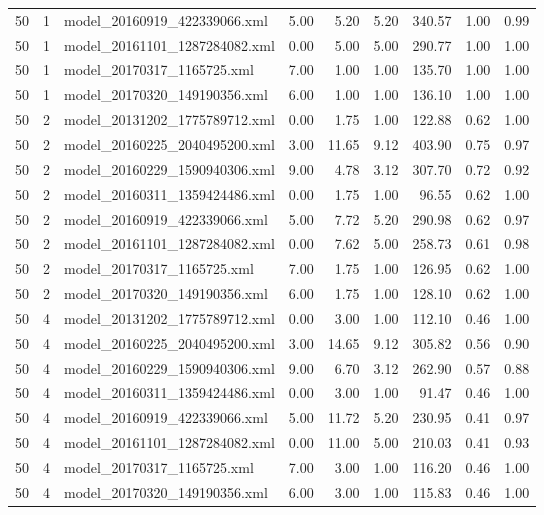 \begin{table}[ht]
\begin{tabular}{rrlrrrrrr}
   50 &   1 & model\_20160919\_422339066.xml & 5.00 & 5.20 & 5.20 & 340.57 & 1.00 & 0.99 \\ 
   50 &   1 & model\_20161101\_1287284082.xml & 0.00 & 5.00 & 5.00 & 290.77 & 1.00 & 1.00 \\ 
   50 &   1 & model\_20170317\_1165725.xml & 7.00 & 1.00 & 1.00 & 135.70 & 1.00 & 1.00 \\ 
   50 &   1 & model\_20170320\_149190356.xml & 6.00 & 1.00 & 1.00 & 136.10 & 1.00 & 1.00 \\ 
   50 &   2 & model\_20131202\_1775789712.xml & 0.00 & 1.75 & 1.00 & 122.88 & 0.62 & 1.00 \\ 
   50 &   2 & model\_20160225\_2040495200.xml & 3.00 & 11.65 & 9.12 & 403.90 & 0.75 & 0.97 \\ 
   50 &   2 & model\_20160229\_1590940306.xml & 9.00 & 4.78 & 3.12 & 307.70 & 0.72 & 0.92 \\ 
   50 &   2 & model\_20160311\_1359424486.xml & 0.00 & 1.75 & 1.00 & 96.55 & 0.62 & 1.00 \\ 
   50 &   2 & model\_20160919\_422339066.xml & 5.00 & 7.72 & 5.20 & 290.98 & 0.62 & 0.97 \\ 
   50 &   2 & model\_20161101\_1287284082.xml & 0.00 & 7.62 & 5.00 & 258.73 & 0.61 & 0.98 \\ 
   50 &   2 & model\_20170317\_1165725.xml & 7.00 & 1.75 & 1.00 & 126.95 & 0.62 & 1.00 \\ 
   50 &   2 & model\_20170320\_149190356.xml & 6.00 & 1.75 & 1.00 & 128.10 & 0.62 & 1.00 \\ 
   50 &   4 & model\_20131202\_1775789712.xml & 0.00 & 3.00 & 1.00 & 112.10 & 0.46 & 1.00 \\ 
   50 &   4 & model\_20160225\_2040495200.xml & 3.00 & 14.65 & 9.12 & 305.82 & 0.56 & 0.90 \\ 
   50 &   4 & model\_20160229\_1590940306.xml & 9.00 & 6.70 & 3.12 & 262.90 & 0.57 & 0.88 \\ 
   50 &   4 & model\_20160311\_1359424486.xml & 0.00 & 3.00 & 1.00 & 91.47 & 0.46 & 1.00 \\ 
   50 &   4 & model\_20160919\_422339066.xml & 5.00 & 11.72 & 5.20 & 230.95 & 0.41 & 0.97 \\ 
   50 &   4 & model\_20161101\_1287284082.xml & 0.00 & 11.00 & 5.00 & 210.03 & 0.41 & 0.93 \\ 
   50 &   4 & model\_20170317\_1165725.xml & 7.00 & 3.00 & 1.00 & 116.20 & 0.46 & 1.00 \\ 
   50 &   4 & model\_20170320\_149190356.xml & 6.00 & 3.00 & 1.00 & 115.83 & 0.46 & 1.00 \\ 

\end{tabular}
\end{table}
